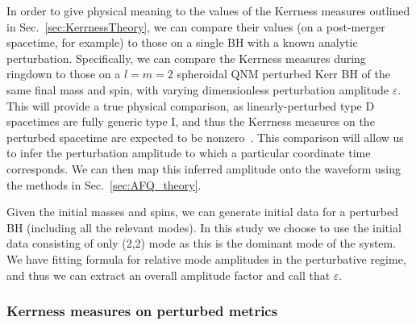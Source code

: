 In order to give physical meaning to the values of the Kerrness measures outlined in Sec.~\ref{sec:KerrnessTheory}, we can compare their values (on a post-merger spacetime, for example) to those on a single BH with a known analytic perturbation. Specifically, we can compare the Kerrness measures during ringdown to those on a $l=m=2$ spheroidal QNM perturbed Kerr BH of the same final mass and spin, with varying dimensionless perturbation amplitude $\varepsilon$. This will provide a true physical comparison, as linearly-perturbed type D spacetimes are fully generic type I, and thus the Kerrness measures on the perturbed spacetime are expected to be nonzero~\cite{Araneda:2015gsa}. This comparison will allow us to infer the perturbation amplitude to which a particular coordinate time corresponds. We can then map this inferred amplitude onto the waveform using the methods in Sec.~\ref{sec:AFQ_theory}. 

Given the initial masses and spins, we can generate initial data for a perturbed BH (including all the relevant modes). In this study we choose to use the initial data consisting of only (2,2) mode as this is the dominant mode of the system. We have fitting formula for relative mode amplitudes in the perturbative regime, and thus we can extract an overall amplitude factor and call that $\varepsilon$. 




\subsubsection{Kerrness measures on perturbed metrics}
\label{sec:PerturbationTheory}


